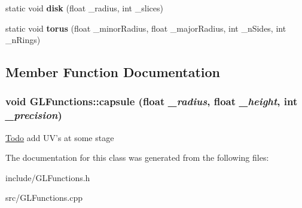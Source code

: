 \begin{DoxyCompactItemize}
\item 
\hypertarget{classGLFunctions_afbe8178a80420f1c8a2afd1833d3d0d8}{
static void {\bfseries disk} (float \_\-radius, int \_\-slices)}
\label{classGLFunctions_afbe8178a80420f1c8a2afd1833d3d0d8}

\item 
\hypertarget{classGLFunctions_a1b2f864088727487fbed8d10479559df}{
static void {\bfseries torus} (float \_\-minorRadius, float \_\-majorRadius, int \_\-nSides, int \_\-nRings)}
\label{classGLFunctions_a1b2f864088727487fbed8d10479559df}

\end{DoxyCompactItemize}


\subsection{Member Function Documentation}
\hypertarget{classGLFunctions_a6f2d4c4c3f5d69b365dffcef7f46654b}{
\subsubsection[{capsule}]{\setlength{\rightskip}{0pt plus 5cm}void GLFunctions::capsule (float {\em \_\-radius}, \/  float {\em \_\-height}, \/  int {\em \_\-precision})}}
\label{classGLFunctions_a6f2d4c4c3f5d69b365dffcef7f46654b}


\begin{Desc}
\item[\hyperlink{todo__todo000001}{Todo}]add UV's at some stage \end{Desc}


The documentation for this class was generated from the following files:\begin{DoxyCompactItemize}
\item 
include/GLFunctions.h\item 
src/GLFunctions.cpp\end{DoxyCompactItemize}
